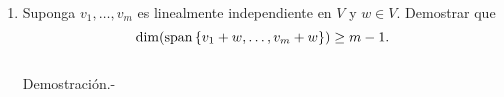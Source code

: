 \begin{enumerate}[\bfseries 1.]
\begin{enumerate}[(a)]
	\end{enumerate}

    \item Suponga $v_1,\ldots,v_m$ es linealmente independiente en $V$ y $w\in V$. Demostrar que 
    $$\dim(\mathop{\mbox{\normalfont span}}\nolimits\left\{v_1+w,\ldots,v_m+w\right\})\geq m-1.$$\\
	Demostración.-\; 

\end{enumerate} 

